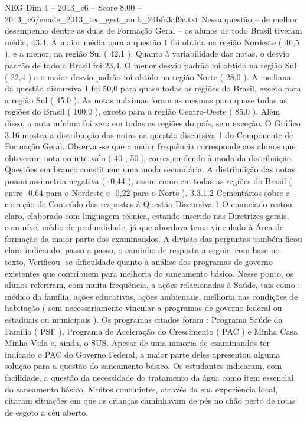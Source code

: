 \begin{textsample}{NEG Dim 4 – 2013\_c6 – Score 8.00 – 2013\_c6/enade\_2013\_tec\_gest\_amb\_24bfe3af9c.txt}
Nessa questão – de melhor desempenho dentre as duas de Formação Geral – os alunos de todo Brasil tiveram média, 43,4.
A maior média para a questão 1 foi obtida na região Nordeste ( 46,5 ), e a menor, na região Sul ( 42,1 ).
Quanto à variabilidade das notas, o desvio padrão de todo o Brasil foi 23,4.
O menor desvio padrão foi obtido na região Sul ( 22,4 ) e o maior desvio padrão foi obtido na região Norte ( 28,0 ).
A mediana da questão discursiva 1 foi 50,0 para quase todas as regiões do Brasil, exceto para a região Sul ( 45,0 ).
As notas máximas foram as mesmas para quase todas as regiões do Brasil ( 100,0 ), exceto para a região Centro-Oeste ( 85,0 ).
Além disso, a nota mínima foi zero em todas as regiões do país, sem exceção.
O Gráfico 3.16 mostra a distribuição das notas na questão discursiva 1 do Componente de Formação Geral.
Observa -se que a maior frequência corresponde aos alunos que obtiveram nota no intervalo ( 40 ; 50 ], correspondendo à moda da distribuição.
Questões em branco constituem uma moda secundária.
A distribuição das notas possui assimetria negativa ( -0,44 ), assim como em todas as regiões do Brasil ( entre -0,64 para o Nordeste e -0,22 para o Norte ). 3.3.1.2 Comentários sobre a correção de Conteúdo das respostas à Questão Discursiva 1 O enunciado restou claro, elaborado com linguagem técnica, estando inserido nas Diretrizes gerais, com nível médio de profundidade, já que abordava tema vinculado à Área de formação da maior parte dos examinandos.
A divisão das perguntas também ficou clara indicando, passo a passo, o caminho de resposta a seguir, com base no texto.
Verificou -se dificuldade quanto à análise dos programas de governo existentes que contribuem para melhoria do saneamento básico.
Nesse ponto, os alunos referiram, com muita frequência, a ações relacionadas à Saúde, tais como : médico da família, ações educativas, ações ambientais, melhoria nas condições de habitação ( sem necessariamente vincular a programas de governo federal ou estaduais ou municipais ).
Os programas citados foram : Programa Saúde da Família ( PSF ), Programa de Aceleração do Crescimento ( PAC ) e Minha Casa Minha Vida e, ainda, o SUS.
Apesar de uma minoria de examinandos ter indicado o PAC do Governo Federal, a maior parte deles apresentou alguma solução para a questão do saneamento básico.
Os estudantes indicaram, com facilidade, a questão da necessidade do tratamento da água como item essencial do saneamento básico.
Muitos concluintes, através da sua experiência local, citaram situações em que as crianças caminhavam de pés no chão perto de rotas de esgoto a céu aberto.

\end{textsample}
